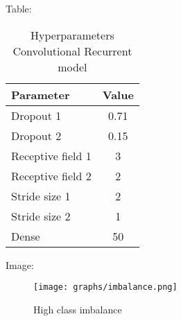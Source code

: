 Table:

\begin{table}[H]
\centering
\begin{tabular}{lc}
\noalign{\smallskip} \hline \hline \noalign{\smallskip} 
Parameter & Value \\ \hline
Dropout  1 & 0.71 \\ 
Dropout  2 & 0.15 \\ 
Receptive field 1 & 3 \\ 
Receptive field 2 & 2  \\ 
Stride size 1 & 2 \\ 
Stride size 2 & 1  \\ 
Dense & 50  \\ \hline
\end{tabular}
\caption{Hyperparameters Convolutional Recurrent model}
\label{Table:hyperconvrec}
\end{table}


Image:

%
\begin{figure}[H]
\centering
\texttt{[image: graphs/imbalance.png]}
\caption{High class imbalance}
\label{fig:imb}
\end{figure}
%